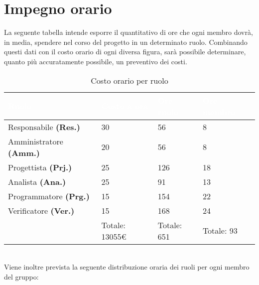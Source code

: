 \documentclass[12pt]{article}
\begin{document}
\section{Impegno orario} \label{sec:impegnoOra}
La seguente tabella intende esporre il quantitativo di ore che ogni membro dovrà, in media, spendere nel corso del progetto in un determinato ruolo. Combinando questi dati con il costo orario di ogni diversa figura, sarà possibile determinare, quanto più accuratamente possibile, un preventivo dei costi.
\begingroup
\setlength{\tabcolsep}{10pt}
\renewcommand{\arraystretch}{1.5}
\begin{table}[h]
    \centering
    \begin{tabularx}{\textwidth}{| l | l | X | l |}
        \hline
        \rowcolor{headerrow} \textbf{\textcolor{white}{Ruolo}} & \textbf{\textcolor{white}{Costo a ora}} & \textbf{\textcolor{white}{Ore ruolo}} & \textbf{\textcolor{white}{Ore membro}} \\
        \hline
        Responsabile \textbf{(Res.)}& 30 & 56  & 8\\
        \hline
        Amministratore \textbf{(Amm.)}& 20 & 56  & 8\\
        \hline
        Progettista \textbf{(Prj.)}& 25 & 126  & 18\\
        \hline
        Analista \textbf{(Ana.)}& 25 & 91  & 13\\
        \hline
        Programmatore \textbf{(Prg.)}& 15 & 154  & 22\\
        \hline
        Verificatore \textbf{(Ver.)}& 15 & 168  & 24\\
        \hline
        & Totale: 13055€ & Totale: 651 & Totale: 93\\
        \hline
    \end{tabularx}
    \caption{Costo orario per ruolo}
    \label{tab:costi}
\end{table}
\\Viene inoltre prevista la seguente distribuzione oraria dei ruoli per ogni membro del gruppo:
\end{document}
